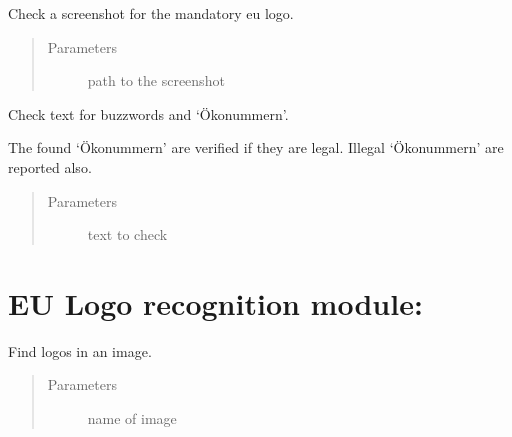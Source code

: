 \documentclass[letterpaper,10pt,english]{sphinxmanual}
\begin{document}
\begin{fulllineitems}
\begin{fulllineitems}
\label{\detokenize{api:oeko.Oeko.check_image}}
Check a screenshot for the mandatory eu logo.
\begin{quote}\begin{description}
\item[{Parameters}] \leavevmode
{} \textendash{} path to the screenshot

\end{description}\end{quote}

\end{fulllineitems}


\begin{fulllineitems}
\label{\detokenize{api:oeko.Oeko.check_text}}
Check text for buzzwords and ‘Ökonummern’.

The found ‘Ökonummern’ are verified if they are legal. Illegal
‘Ökonummern’ are reported also.
\begin{quote}\begin{description}
\item[{Parameters}] \leavevmode
{} \textendash{} text to check

\end{description}\end{quote}

\end{fulllineitems}


\end{fulllineitems}



\section{EU Logo recognition module:}
\label{\detokenize{api:eu-logo-recognition-module}}\label{\detokenize{api:module-logos}}\label{\detokenize{api:module-find_logos}}

\begin{fulllineitems}
\label{\detokenize{api:find_logos.find_logos}}
Find logos in an image.
\begin{quote}\begin{description}
\item[{Parameters}] \leavevmode
{} \textendash{} name of image

\end{description}\end{quote}

\end{fulllineitems}
\end{document}

